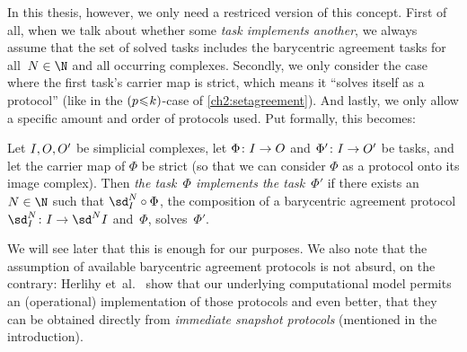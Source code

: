 In this thesis, however, we only need a restriced version of this concept.
First of all, when we talk about whether some \emph{task implements another},
we always assume that the set of solved tasks includes the barycentric agreement
tasks  for all~$N\in\N$ and all occurring
complexes. Secondly, we only consider the case where the first task's carrier map
is strict, which means it \enquote{solves itself as a protocol} (like in the
$(p\mkern1mu{\leq}\mkern1muk)$-case of \cref{ch2:setagreement}). And lastly, we
only allow a specific amount and order of protocols used. Put formally, this
becomes:

\begin{thDef}
    Let $\cI,\cO,\cO'$ be simplicial complexes, let
    $\Phi\colon\cI\to\cO$ and $\Phi'\colon\cI\to\cO'$ be tasks, and
    let the carrier map of $\Phi$ be strict (so that we can consider $\Phi$ as a
    protocol onto its image complex). Then \emph{the task~$\Phi$ implements the
    task~$\Phi'$} if there exists an $N\in\N$ such that $\sd_{\cI}^N\after\Phi$,
    the composition of a barycentric agreement protocol
    $\sd_{\cI}^N\colon\cI\to\sd^N\cI$ and~$\Phi$, solves~$\Phi'$.
\end{thDef}

We will see later that this is enough for our purposes. We also note that the
assumption of available barycentric agreement protocols is not absurd, on
the contrary: Herlihy et~al.~\cite[Corollary 4.2.10]{bookc:herlihyetal13} show
that our underlying computational model permits an (operational) implementation
of those protocols and even better, that they can be obtained directly from 
\emph{immediate snapshot protocols} (mentioned in the introduction).
